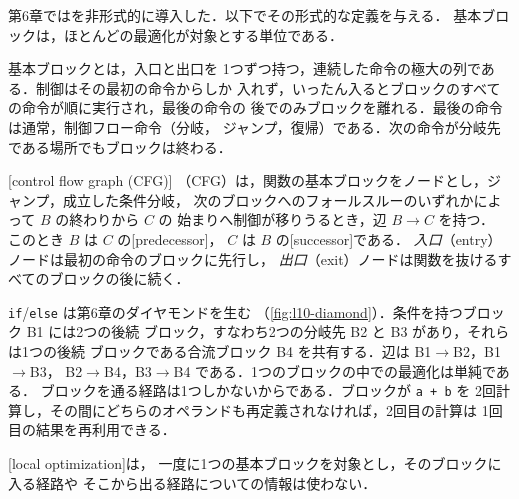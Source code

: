 \documentclass[../main.tex]{subfiles}
\begin{document}
第6章ではを非形式的に導入した．以下でその形式的な定義を与える．
基本ブロックは，ほとんどの最適化が対象とする単位である．

\begin{definition}[基本ブロック]
  \label{def:l10-basic-block}
  基本ブロックとは，入口と出口を
  1つずつ持つ，連続した命令の極大の列である．制御はその最初の命令からしか
  入れず，いったん入るとブロックのすべての命令が順に実行され，最後の命令の
  後でのみブロックを離れる．最後の命令は通常，制御フロー命令（分岐，
  ジャンプ，復帰）である．次の命令が分岐先である場所でもブロックは終わる．
\end{definition}

\begin{definition}
  [control flow graph (CFG)]
  （CFG）は，関数の基本ブロックをノードとし，ジャンプ，成立した条件分岐，
  次のブロックへのフォールスルーのいずれかによって $B$ の終わりから $C$ の
  始まりへ制御が移りうるとき，辺 $B\to C$ を持つ．
  このとき $B$ は $C$ の[predecessor]，
  $C$ は $B$ の[successor]である．
  \emph{入口}（entry）ノードは最初の命令のブロックに先行し，
  \emph{出口}（exit）ノードは関数を抜けるすべてのブロックの後に続く．
\end{definition}

\begin{marginfigure}
  \centering
  
  \caption{\texttt{if}/\texttt{else} のダイヤモンド型 CFG．}
  \label{fig:l10-diamond}
\end{marginfigure}
\texttt{if}/\texttt{else} は第6章のダイヤモンドを生む
（\cref{fig:l10-diamond}）．条件を持つブロック B1 には2つの後続
ブロック，すなわち2つの分岐先 B2 と B3 があり，それらは1つの後続
ブロックである合流ブロック B4 を共有する．辺は B1$\to$B2，B1$\to$B3，
B2$\to$B4，B3$\to$B4 である．1つのブロックの中での最適化は単純である．
ブロックを通る経路は1つしかないからである．ブロックが \texttt{a + b} を
2回計算し，その間にどちらのオペランドも再定義されなければ，2回目の計算は
1回目の結果を再利用できる．

\begin{definition}[局所最適化]
  [local optimization]は，
  一度に1つの基本ブロックを対象とし，そのブロックに入る経路や
  そこから出る経路についての情報は使わない．
\end{definition}
\end{document}

